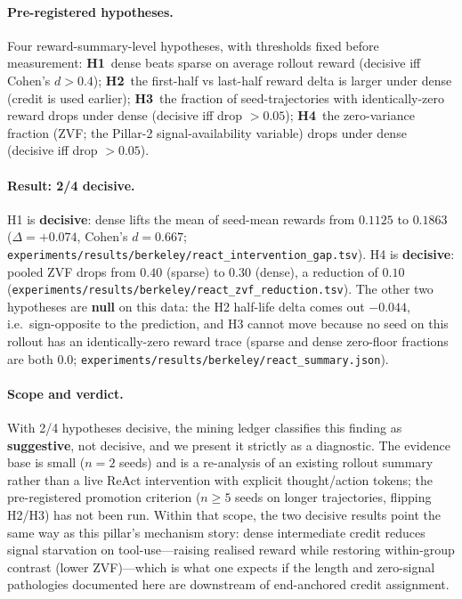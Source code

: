 \documentclass{article}
\begin{document}
\paragraph{Pre-registered hypotheses.}
Four reward-summary-level hypotheses, with thresholds fixed
before measurement: \textbf{H1}~dense beats sparse on average
rollout reward (decisive iff Cohen's $d > 0.4$);
\textbf{H2}~the first-half vs last-half reward delta is larger
under dense (credit is used earlier); \textbf{H3}~the fraction
of seed-trajectories with identically-zero reward drops under
dense (decisive iff drop $> 0.05$); \textbf{H4}~the
zero-variance fraction (ZVF; the Pillar-2 signal-availability
variable) drops under dense (decisive iff drop $> 0.05$).

\paragraph{Result: 2/4 decisive.}
H1 is \textbf{decisive}: dense lifts the mean of seed-mean
rewards from $0.1125$ to $0.1863$ ($\Delta = +0.074$, Cohen's
$d = 0.667$;
\texttt{experiments/results/berkeley/react\_intervention\_gap.tsv}).
H4 is \textbf{decisive}: pooled ZVF drops from $0.40$ (sparse)
to $0.30$ (dense), a reduction of $0.10$
(\texttt{experiments/results/berkeley/react\_zvf\_reduction.tsv}).
The other two hypotheses are \textbf{null} on this data: the H2
half-life delta comes out $-0.044$, i.e.\ sign-opposite to the
prediction, and H3 cannot move because no seed on this rollout
has an identically-zero reward trace (sparse and dense zero-floor
fractions are both $0.0$;
\texttt{experiments/results/berkeley/react\_summary.json}).

\paragraph{Scope and verdict.}
With 2/4 hypotheses decisive, the mining ledger classifies this
finding as \textbf{suggestive}, not decisive, and we present it
strictly as a diagnostic. The evidence base is small ($n{=}2$
seeds) and is a re-analysis of an existing rollout summary
rather than a live ReAct intervention with explicit
thought/action tokens; the pre-registered promotion criterion
($n \ge 5$ seeds on longer trajectories, flipping H2/H3) has not
been run. Within that scope, the two decisive results point the
same way as this pillar's mechanism story: dense intermediate
credit reduces signal starvation on tool-use---raising realised
reward while restoring within-group contrast (lower ZVF)---which
is what one expects if the length and zero-signal pathologies
documented here are downstream of end-anchored credit
assignment.
 
\end{document}
